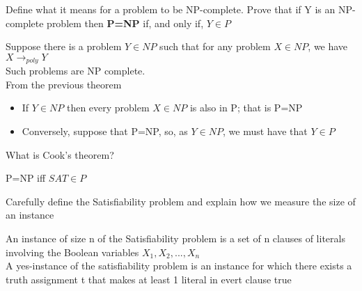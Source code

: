\documentclass[addpoints]{exam}
\begin{document}
\begin{questions}
\question[6]Define what it means for a problem to be NP-complete. Prove that if Y is an NP-complete problem then \textbf{P=NP} if, and only if, $Y\in P$
\begin{solution}[2in]
	Suppose there is a problem $Y\in NP$ such that for any problem $X\in NP$, we have $X\rightarrow_{poly} Y$\\
	Such problems are NP complete.\\
	From the previous theorem
	\begin{itemize}
		\item If $Y\in NP$ then every problem $X\in NP$ is also in P; that is P=NP
		\item Conversely, suppose that P=NP, so, as $Y\in NP$, we must have that $Y\in P$
	\end{itemize}
	 
\end{solution}

\question[2]What is Cook's theorem?
\begin{solution}[2in]
	P=NP iff $SAT\in P$
\end{solution}

\question[4]Carefully define the Satisfiability problem and explain how we measure the size of an instance
\begin{solution}[2in]
	An instance of size n of the Satisfiability problem is a set of n clauses of literals involving the Boolean variables $X_1,X_2,...,X_n$\\
	A yes-instance of the satisfiability problem is an instance for which there exists a truth assignment t that makes at least 1 literal in evert clause true  
\end{solution}	
\end{questions}
	
\end{document}

